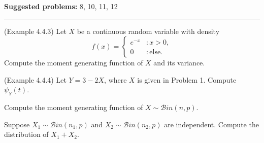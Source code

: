\documentclass[12pt,reqno]{amsart}
\begin{document}
\textbf{Suggested problems:} 8, 10, 11, 12

\bigskip
\hrule

\bigskip
\prob (Example 4.4.3) Let $X$ be a continuous random variable with density
\[
	f(x) = \begin{cases}
	e^{-x} & : x>0, \\
	0 & : \text{else}.
	\end{cases}
\]
Compute the moment generating function of $X$ and its variance.

\vfill
\prob (Example 4.4.4) Let $Y=3-2X$, where $X$ is given in Problem 1. Compute $\psi_Y(t)$.

\vfill
\newpage
\prob Compute the moment generating function of $X\sim \mathcal{B}in(n,p)$.

\vfill
\prob Suppose $X_1 \sim \mathcal{B}in(n_1,p)$ and $X_2 \sim \mathcal{B}in(n_2,p)$ are independent. Compute the distribution of $X_1 + X_2$.

\vfill
\end{document}
